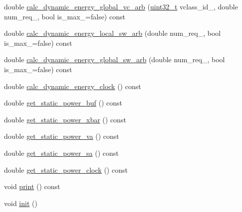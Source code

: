 \begin{DoxyCompactItemize}
\item 
double \hyperlink{classOrionRouter_aa6e38b256dbf2a34dc0472dfb4a71f0c}{calc\_\-dynamic\_\-energy\_\-global\_\-vc\_\-arb} (\hyperlink{Type_8hh_a435d1572bf3f880d55459d9805097f62}{uint32\_\-t} vclass\_\-id\_\-, double num\_\-req\_\-, bool is\_\-max\_\-=false) const 
\item 
double \hyperlink{classOrionRouter_a726e4e57d9411dd1ac00ff03336c99b4}{calc\_\-dynamic\_\-energy\_\-local\_\-sw\_\-arb} (double num\_\-req\_\-, bool is\_\-max\_\-=false) const 
\item 
double \hyperlink{classOrionRouter_a073f1dd3e634d86be25367d729494507}{calc\_\-dynamic\_\-energy\_\-global\_\-sw\_\-arb} (double num\_\-req\_\-, bool is\_\-max\_\-=false) const 
\item 
double \hyperlink{classOrionRouter_ad4cef03e5d5c484cd094aecd9d704ab1}{calc\_\-dynamic\_\-energy\_\-clock} () const 
\item 
double \hyperlink{classOrionRouter_a4d81d81940059916f6e9ac55ba87a3db}{get\_\-static\_\-power\_\-buf} () const 
\item 
double \hyperlink{classOrionRouter_af2bcfbf8f5019a209b658392ed4c540c}{get\_\-static\_\-power\_\-xbar} () const 
\item 
double \hyperlink{classOrionRouter_a4219f60bb8912ad723dc8549af9b0ee6}{get\_\-static\_\-power\_\-va} () const 
\item 
double \hyperlink{classOrionRouter_a4561aef5ee7a98a073c770968d461e0b}{get\_\-static\_\-power\_\-sa} () const 
\item 
double \hyperlink{classOrionRouter_a594c9a7fb80a0920f0aaa00c0bd388bf}{get\_\-static\_\-power\_\-clock} () const 
\item 
void \hyperlink{classOrionRouter_a3a3ab31c19c38fe926198ddc4a0a4a91}{print} () const 
\item 
void \hyperlink{classOrionRouter_a02fd73d861ef2e4aabb38c0c9ff82947}{init} ()
\end{DoxyCompactItemize}
